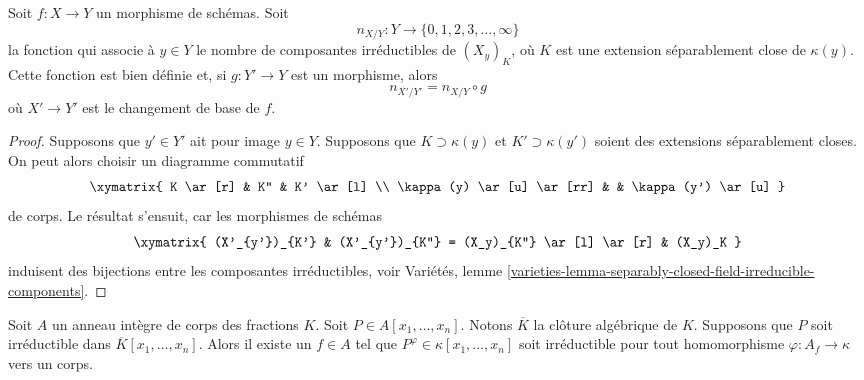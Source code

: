 \begin{lemma}
\label{lemma-base-change-fibres-nr-geometrically-irreducible-components}
Soit $f : X \to Y$ un morphisme de schémas. Soit
$$
n_{X/Y} : Y \to \{0, 1, 2, 3, \ldots, \infty\}
$$
la fonction qui associe à $y \in Y$ le nombre de composantes irréductibles
de $(X_y)_K$, où $K$ est une extension séparablement close
de $\kappa(y)$. Cette fonction est bien définie et, si $g : Y' \to Y$ est un morphisme,
alors
$$
n_{X'/Y'} = n_{X/Y} \circ g
$$
où $X' \to Y'$ est le changement de base de $f$.
\end{lemma}

\begin{proof}
Supposons que $y' \in Y'$ ait pour image $y \in Y$.
Supposons que $K \supset \kappa(y)$ et $K' \supset \kappa(y')$ soient des extensions
séparablement closes. On peut alors choisir un diagramme commutatif
$$
\xymatrix{
K \ar[r] & K'' & K' \ar[l] \\
\kappa(y) \ar[u] \ar[rr] & & \kappa(y') \ar[u]
}
$$
de corps. Le résultat s'ensuit, car les morphismes de schémas
$$
\xymatrix{
(X'_{y'})_{K'} &
(X'_{y'})_{K''} = (X_y)_{K''} \ar[l] \ar[r] &
(X_y)_K
}
$$
induisent des bijections entre les composantes irréductibles, voir
Variétés,
lemme \ref{varieties-lemma-separably-closed-field-irreducible-components}.
\end{proof}

\begin{lemma}
\label{lemma-irreducible-polynomial-over-domain}
Soit $A$ un anneau intègre de corps des fractions $K$.
Soit $P \in A[x_1, \ldots, x_n]$.
Notons $\overline{K}$ la clôture algébrique de $K$.
Supposons que $P$ soit irréductible dans $\overline{K}[x_1, \ldots, x_n]$.
Alors il existe un $f \in A$ tel que
$P^\varphi \in \kappa[x_1, \ldots, x_n]$ soit irréductible pour tout
homomorphisme $\varphi : A_f \to \kappa$ vers un corps.
\end{lemma}


